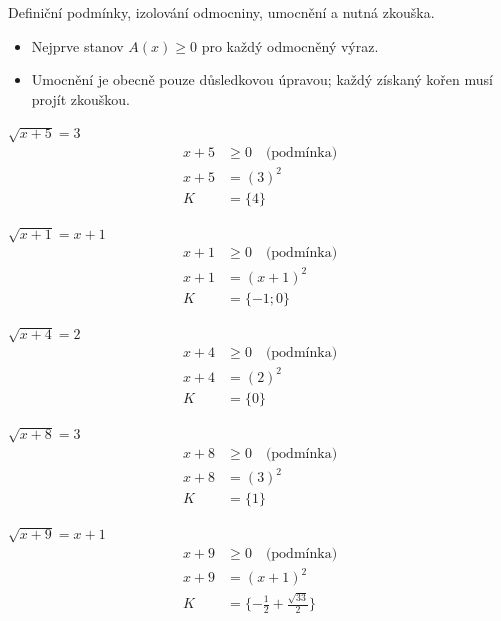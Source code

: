 \documentclass[11pt,a4paper]{article}
\begin{document}
Definiční podmínky, izolování odmocniny, umocnění a nutná zkouška.
\begin{itemize}
\item Nejprve stanov $A(x)\ge0$ pro každý odmocněný výraz.
\item Umocnění je obecně pouze důsledkovou úpravou; každý získaný kořen musí projít zkouškou.
\end{itemize}
\begin{prikladReseniBox}[title={Příklad 1}]
$\sqrt{x + 5}=3$
\tcblower
\[
\begin{aligned}
x+5&\ge0\quad\text{(podmínka)}\\[2pt]
x+5&=(3)^2\\[2pt]
K&=\{4\}
\end{aligned}
\]
\end{prikladReseniBox}
\begin{prikladReseniBox}[title={Příklad 2}]
$\sqrt{x + 1}=x + 1$
\tcblower
\[
\begin{aligned}
x+1&\ge0\quad\text{(podmínka)}\\[2pt]
x+1&=(x + 1)^2\\[2pt]
K&=\{-1;0\}
\end{aligned}
\]
\end{prikladReseniBox}
\begin{prikladReseniBox}[title={Příklad 3}]
$\sqrt{x + 4}=2$
\tcblower
\[
\begin{aligned}
x+4&\ge0\quad\text{(podmínka)}\\[2pt]
x+4&=(2)^2\\[2pt]
K&=\{0\}
\end{aligned}
\]
\end{prikladReseniBox}
\begin{zadaniReseniBox}[title={Samostatná práce 1}]
$\sqrt{x + 8}=3$
\tcblower
\[
\begin{aligned}
x+8&\ge0\quad\text{(podmínka)}\\[2pt]
x+8&=(3)^2\\[2pt]
K&=\{1\}
\end{aligned}
\]
\end{zadaniReseniBox}
\begin{zadaniReseniBox}[title={Samostatná práce 2}]
$\sqrt{x + 9}=x + 1$
\tcblower
\[
\begin{aligned}
x+9&\ge0\quad\text{(podmínka)}\\[2pt]
x+9&=(x + 1)^2\\[2pt]
K&=\{- \frac{1}{2} + \frac{\sqrt{33}}{2}\}
\end{aligned}
\]
\end{zadaniReseniBox}
\end{document}
